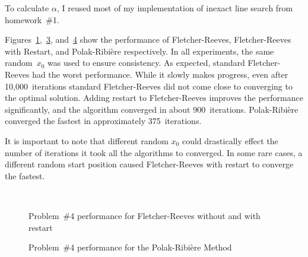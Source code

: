 \noindent
To calculate $\alpha$, I reused most of my implementation of inexact line search from homework~\#1.

Figures~\ref{fig:p04:FR},~\ref{fig:p04:FRwithRestart}, and~\ref{fig:p04:PR} show the performance of Fletcher-Reeves, Fletcher-Reeves with Restart, and Polak-Ribi\`{e}re respectively. In all experiments, the same random~$x_0$ was used to ensure consistency.  As expected, standard Fletcher-Reeves had the worst performance. While it slowly makes progress, even after 10,000~iterations standard Fletcher-Reeves did not come close to converging to the optimal solution.  Adding restart to Fletcher-Reeves improves the performance significantly, and the algorithm converged in about 900~iterations.  Polak-Ribi\`{e}re converged the fastest in approximately 375~iterations.

It is important to note that different random $x_0$ could drastically effect the number of iterations it took all the algorithms to converged.  In some rare cases, a different random start position caused Fletcher-Reeves with restart to converge the fastest.
\begin{figure}[p]
  \centering
  \begin{subfigure}[t]{0.48\textwidth}
    \centering
    
    \caption{}\label{fig:p04:FR}
  \end{subfigure}
  ~
  \begin{subfigure}[t]{0.48\textwidth}
    \centering
    
    \caption{}\label{fig:p04:FRwithRestart}
  \end{subfigure}
  \caption{Problem~\#4 performance for Fletcher-Reeves without and with restart}
\end{figure}

\begin{figure}[p]
  \centering
  
  \caption{Problem~\#4 performance for the Polak-Ribi\`{e}re Method}\label{fig:p04:PR}
\end{figure}
